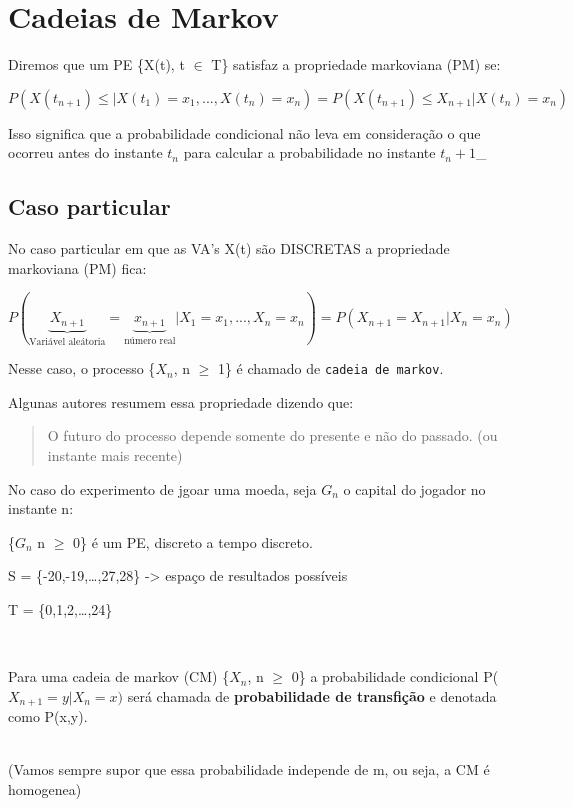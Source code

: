\documentclass[]{article}
\theoremstyle{definition}
\theoremstyle{definition}
\theoremstyle{definition}
\theoremstyle{remark}
\let\BeginKnitrBlock\begin \let\EndKnitrBlock\end
\begin{document}
\section{Cadeias de Markov}\label{cadeias-de-markov}

Diremos que um PE \{X(t), t \(\in\) T\} satisfaz a propriedade
markoviana (PM) se:

\[P(X(t_{n+1}) \leq | X(t_1) = x_1,...,X(t_n)=x_n) = P(X(t_{n+1}) \leq
X_{n+1} | X(t_n) = x_n)\]

Isso significa que a probabilidade condicional não leva em consideração
o que ocorreu antes do instante \(t_n\) para calcular a probabilidade no
instante \(t_n + 1\)\_

\subsection{Caso particular}\label{caso-particular}

No caso particular em que as VA's X(t) são DISCRETAS a propriedade
markoviana (PM) fica:

\[P(\underbrace{X_{n+1}}_{\text{Variável aleátoria}} =
\underbrace{x_{n+1}}_{\text{número real}}| X_1 = x_1,...,X_n=x_n) =
P(X_{n+1} = X_{n+1}| X_n = x_n)\]

Nesse caso, o processo \{\(X_n\), n \(\geq\) 1\} é chamado de
\texttt{cadeia\ de\ markov}.

Algunas autores resumem essa propriedade dizendo que:

\begin{quote}
O futuro do processo depende somente do presente e não do passado. (ou
instante mais recente)
\end{quote}

\BeginKnitrBlock{example}
\protect\hypertarget{exm:unnamed-chunk-19}{}{\label{exm:unnamed-chunk-19}
}No caso do experimento de jgoar uma moeda, seja \(G_n\) o capital do
jogador no instante n:

\{\(G_n\) n \(\geq\) 0\} é um PE, discreto a tempo discreto.

S = \{-20,-19,\ldots{},27,28\} -\textgreater{} espaço de resultados
possíveis

T = \{0,1,2,\ldots{},24\}
\EndKnitrBlock{example}\\
\BeginKnitrBlock{definition}
\protect\hypertarget{def:unnamed-chunk-20}{}{\label{def:unnamed-chunk-20}
}Para uma cadeia de markov (CM) \{\(X_n\), n \(\geq\) 0\} a
probabilidade condicional P(\(X_{n+1} = y | X_n = x)\) será chamada de
\textbf{probabilidade de transfição} e denotada como P(x,y).
\EndKnitrBlock{definition}\\
(Vamos sempre supor que essa probabilidade independe de m, ou seja, a CM
é homogenea)
\end{document}
